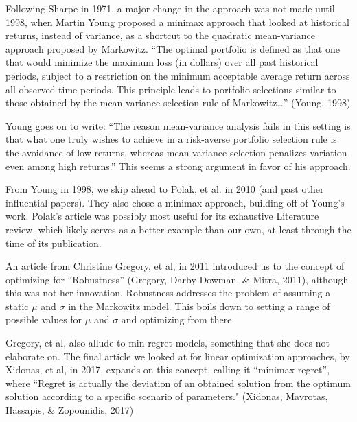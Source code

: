 \documentclass[11pt]{article} %
\begin{document}
Following Sharpe in 1971, a major change in the approach was not made until 1998, when Martin Young proposed a minimax approach that looked at historical returns, instead of variance, as a shortcut to the quadratic mean-variance approach proposed by Markowitz. ``The optimal portfolio is defined as that one that would minimize the maximum loss (in dollars) over all past historical periods, subject to a restriction on the minimum acceptable average return across all observed time periods. This principle leads to portfolio selections similar to those obtained by the mean-variance selection rule of Markowitz…” (Young, 1998)

Young goes on to write: ``The reason mean-variance analysis fails in this setting is that what one truly wishes to achieve in a risk-averse portfolio selection rule is the avoidance of low returns, whereas mean-variance selection penalizes variation even among high returns.” This seems a strong argument in favor of his approach.

From Young in 1998, we skip ahead to Polak, et al. in 2010 (and past other influential papers). They also chose a minimax approach, building off of Young’s work. Polak’s article was possibly most useful for its exhaustive Literature review, which likely serves as a better example than our own, at least through the time of its publication.

An article from Christine Gregory, et al, in 2011 introduced us to the concept of optimizing for ``Robustness” (Gregory, Darby-Dowman, \& Mitra, 2011), although this was not her innovation. Robustness addresses the problem of assuming a static $\mu$ and $\sigma$ in the Markowitz model. This boils down to setting a range of possible values for $\mu$ and $\sigma$ and optimizing from there.

Gregory, et al, also allude to min-regret models, something that she does not elaborate on. The final article we looked at for linear optimization approaches, by Xidonas, et al, in 2017, expands on this concept, calling it ``minimax regret”, where ``Regret is actually the deviation of an obtained solution from the optimum solution according to a specific scenario of parameters." (Xidonas, Mavrotas, Hassapis, \& Zopounidis, 2017)
\end{document}
